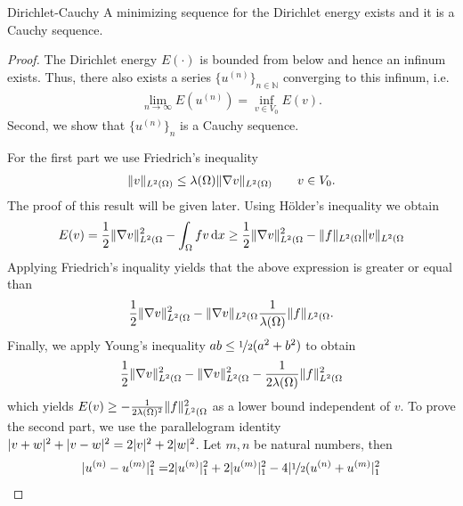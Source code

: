 \begin{Lemma}{Dirichlet-Cauchy}
  A minimizing sequence for the Dirichlet energy exists and it is a
  Cauchy sequence.
\end{Lemma}

\begin{proof}
  The Dirichlet energy $E(\cdot)$ is bounded from
  below and hence an infinum exists. Thus, there also exists a series
  $\{u^{(n)}\}_{n \in \mathbb{N}}$ converging to this infinum, i.e.
  \begin{gather*}
    \lim_{n \to \infty} E(u^{(n)}) = \inf_{v \in V_0} E(v).
  \end{gather*}
  Second, we show that $\{u^{(n)}\}_n$ is a Cauchy sequence.
  
  For the first part we use Friedrich's inequality
  \begin{gather*}
    \lVert v\rVert_{L^2(\Omega)} \le \lambda(\Omega)
    \lVert\nabla v\rVert_{L^2(\Omega)} \qquad v \in V_0.
  \end{gather*}
  The proof of this result will be given later. Using Hölder's inequality
  we obtain
  \begin{gather*}
    E(v) = \frac 12 \lVert\nabla v\rVert^2 _{L^2(\Omega} - \int_\Omega fv \,\mathrm{d} x
    \ge \frac 12 \lVert\nabla v\rVert^2 _{L^2(\Omega}
    - \lVert f\rVert_{L^2(\Omega} \lVert v\rVert_{L^2(\Omega}
  \end{gather*}
  Applying Friedrich's inquality yields that the above expression is
  greater or equal than
  \begin{gather*}
    \frac 12 \lVert\nabla v\rVert^2 _{L^2(\Omega}
    - \lVert\nabla v\rVert_{L^2(\Omega} \frac 1{\lambda (\Omega)}
    \lVert f\rVert_{L^2(\Omega}.
  \end{gather*}
  Finally, we apply Young's inequality $ab \le \nicefrac 12 (a^2 + b^2)$ to obtain
  \begin{gather*}
    \frac 12 \lVert\nabla v\rVert^2 _{L^2(\Omega}
    - \lVert\nabla v\rVert_{L^2(\Omega}^2 - \frac 1{2\lambda (\Omega)} \lVert f\rVert_{L^2(\Omega}^2
  \end{gather*}
  which yields $E(v) \ge - \frac 1{2\lambda (\Omega)^2} \lVert f\rVert_{L^2(\Omega}^2$
  as a lower bound independent of $v$. To prove the second part,
  we use the parallelogram identity $\lvert v+w\rvert^2 + \lvert v-w\rvert^2 = 2\lvert v\rvert^2 + 2 \lvert w\rvert^2$.
  Let $m, n$ be natural numbers, then
  \begin{align*}
    \snorm{u^{(n)} - u^{(m)}}^2 _1 =& 2 \snorm{u^{(n)}}^2 _1
                                      + 2 \snorm{u^{(m)}}^2_1- 4 \snorm{\nicefrac 12 (u^{(n)} + u^{(m)}}^2_1 \\

\end{align*}
\end{proof}
